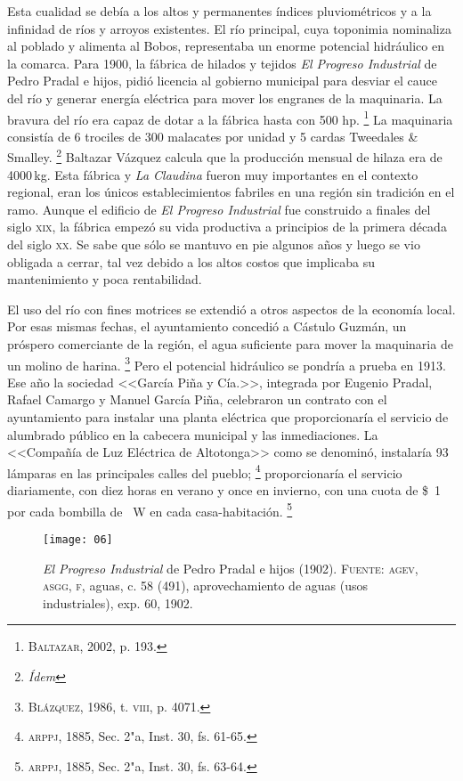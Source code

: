 \documentclass[14pt,twoside,final]{extbook} %
\let\oldfootnote\footnote
\renewcommand\footnote[1]{%
\oldfootnote{\hspace{1mm}#1}}
\begin{document}
Esta cualidad se debía a los altos y permanentes índices pluviométricos y a la infinidad de ríos y arroyos existentes. El río principal, cuya toponimia nominaliza al poblado y alimenta al Bobos, representaba un enorme potencial hidráulico en la comarca. Para 1900, la fábrica de hilados y tejidos \emph{El Progreso Industrial} de Pedro Pradal e hijos, pidió licencia al gobierno municipal para desviar el cauce del río y generar energía eléctrica para mover los engranes de la maquinaria. La bravura del río era capaz de dotar a la fábrica hasta con 500 hp.\footnote{\textsc{Baltazar}, 2002, p. 193.} La maquinaria consistía de 6 trociles de 300 malacates por unidad y 5 cardas Tweedales \& Smalley.\footnote{\em Ídem} Baltazar Vázquez calcula que la producción mensual de hilaza era de 4000\,kg. Esta fábrica y \emph{La Claudina} fueron muy importantes en el contexto regional, eran los únicos establecimientos fabriles en una región sin tradición en el ramo. Aunque el edificio de \emph{El Progreso Industrial} fue construido a finales del siglo \textsc{xix}, la fábrica empezó su vida productiva a principios de la primera década del siglo \textsc{xx}. Se sabe que sólo se mantuvo en pie algunos años y luego se vio obligada a cerrar, tal vez debido a los altos costos que implicaba su mantenimiento y poca rentabilidad.

El uso del río con fines motrices se extendió a otros aspectos de la economía local. Por esas mismas fechas, el ayuntamiento concedió a Cástulo Guzmán, un próspero comerciante de la región, el agua suficiente para mover la maquinaria de un molino de harina.\footnote{\textsc{Blázquez}, 1986, t. \textsc{viii}, p. 4071.} Pero el potencial hidráulico se pondría a prueba en 1913. Ese año la sociedad <<García Piña y Cía.>>, integrada por Eugenio Pradal, Rafael Camargo y Manuel García Piña, celebraron un contrato con el ayuntamiento para instalar una planta eléctrica que proporcionaría el servicio de alumbrado público en la cabecera municipal y las inmediaciones. La <<Compañía de Luz Eléctrica de Altotonga>> como se denominó, instalaría 93 lámparas en las principales calles del pueblo;\footnote{\textsc{arppj}, 1885, Sec. 2"a, Inst. 30, fs. 61-65.} proporcionaría el servicio diariamente, con diez horas en verano y once en invierno, con una cuota de \$~1 por cada bombilla de ~W en cada casa-habitación.\footnote{\textsc{arppj}, 1885, Sec. 2"a, Inst. 30, fs. 63-64.}
\begin{sidewaysfigure}
\centering
\texttt{[image: 06]}
\caption[\emph{El Progreso Industrial} de Pedro Pradal e hijos (1902)]{\emph{El Progreso Industrial} de Pedro Pradal e hijos (1902). \textsc{Fuente:} \textsc{agev, asgg, f}, aguas, c. 58 (491), aprovechamiento de aguas (usos industriales), exp. 60, 1902.}
\label{fig:progreso-industrial}
\end{sidewaysfigure}
\end{document}
